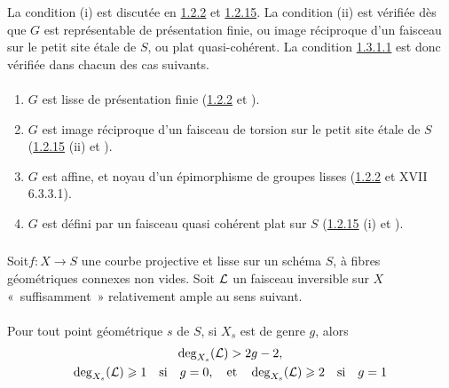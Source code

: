 \documentclass[10pt]{../fichiers-configuration-latex/smfart}
\begin{document}
La condition (i) est discutée en \hyperref[XVIII.thm1.2.2]{1.2.2} et
\hyperref[XVIII.var1.2.15]{1.2.15}. La condition (ii)
est vérifiée dès que $G$ est représentable de présentation finie, ou
image réciproque d'un faisceau sur le petit site étale de $S$, ou plat
quasi-cohérent. La condition \hyperref[XVIII.par1.3.1.1]{1.3.1.1} est donc vérifiée
dans chacun des cas suivants.

\paragraph{}
\begin{enumerate}
\renewcommand{\theenumi}{\alph{enumi}}
\renewcommand{\labelenumi}{(\theenumi)}
\item $G$ est lisse de présentation finie (\hyperref[XVIII.thm1.2.2]{1.2.2} et
  ). 

\item $G$ est image réciproque d'un faisceau de torsion sur le petit
site étale de $S$ (\hyperref[XVIII.var1.2.15]{1.2.15} (ii) et ).

\item $G$ est affine, et noyau d'un épimorphisme de groupes lisses
(\hyperref[XVIII.thm1.2.2]{1.2.2} et XVII 6.3.3.1).

\item $G$ est défini par un faisceau quasi cohérent plat sur $S$
(\hyperref[XVIII.var1.2.15]{1.2.15} (i) et ).
\end{enumerate}

\subsubsection{}
Soit\pageoriginale $f:X\rightarrow S$ une courbe projective et lisse
sur un schéma 
$S$, à fibres géométriques connexes non vides. Soit ${\mathcal L}$
un faisceau inversible sur $X$ « suffisamment » relativement
ample au sens suivant.

\paragraph{}
Pour tout point géométrique $s$ de $S$, si $X_{s}$ est de genre $g$,
alors
\begin{gather*}
\deg_{X_{s}}({\mathcal L})>2g-2,\\
\deg_{X_{s}}({\mathcal L})\geqslant 1\quad\mbox{\rm si}\quad g=0,\quad \text{et}\quad
\deg_{X_{s}}({\mathcal L})\geqslant 2\quad\mbox{\rm si}\quad g=1
\end{gather*}
\end{document}
